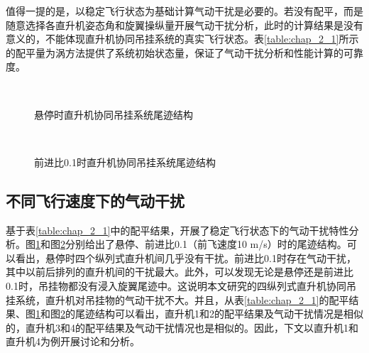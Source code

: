 值得一提的是，以稳定飞行状态为基础计算气动干扰是必要的。若没有配平，而是随意选择各直升机姿态角和旋翼操纵量开展气动干扰分析，此时的计算结果是没有意义的，不能体现直升机协同吊挂系统的真实飞行状态。表\ref{table:chap_2_1}所示的配平量为涡方法提供了系统初始状态量，保证了气动干扰分析和性能计算的可靠度。

\begin{figure}[!htb]
  \centering
  \quad 
  \\
  \caption{悬停时直升机协同吊挂系统尾迹结构}
  \label{fig:chap3_5_1_1_1}
\end{figure}

\begin{figure}[!htb]
  \centering
  \quad 
  \\
  \caption{前进比0.1时直升机协同吊挂系统尾迹结构}
  \label{fig:chap3_5_1_1_2}
\end{figure}

\subsection{不同飞行速度下的气动干扰}
基于表\ref{table:chap_2_1}中的配平结果，开展了稳定飞行状态下的气动干扰特性分析。图\ref{fig:chap3_5_1_1_1}和图\ref{fig:chap3_5_1_1_2}分别给出了悬停、前进比0.1（前飞速度10 m/s）时的尾迹结构。可以看出，悬停时四个纵列式直升机间几乎没有干扰。前进比0.1时存在气动干扰，其中以前后排列的直升机间的干扰最大。此外，可以发现无论是悬停还是前进比0.1时，吊挂物都没有浸入旋翼尾迹中。这说明本文研究的四纵列式直升机协同吊挂系统，直升机对吊挂物的气动干扰不大。并且，从表\ref{table:chap_2_1}的配平结果、图\ref{fig:chap3_5_1_1_1}和图\ref{fig:chap3_5_1_1_2}的尾迹结构可以看出，直升机1和2的配平结果及气动干扰情况是相似的，直升机3和4的配平结果及气动干扰情况也是相似的。因此，下文以直升机1和直升机4为例开展讨论和分析。

